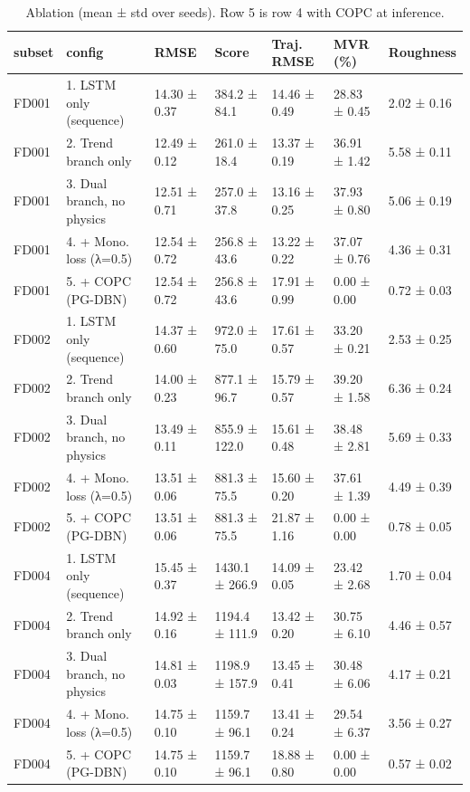 \begin{table}
\caption{Ablation (mean ± std over seeds). Row 5 is row 4 with COPC at inference.}
\label{tab:table2_ablation}
\begin{tabular}{lllllll}
\toprule
subset & config & RMSE & Score & Traj. RMSE & MVR (\%) & Roughness \\
\midrule
FD001 & 1. LSTM only (sequence) & 14.30 ± 0.37 & 384.2 ± 84.1 & 14.46 ± 0.49 & 28.83 ± 0.45 & 2.02 ± 0.16 \\
FD001 & 2. Trend branch only & 12.49 ± 0.12 & 261.0 ± 18.4 & 13.37 ± 0.19 & 36.91 ± 1.42 & 5.58 ± 0.11 \\
FD001 & 3. Dual branch, no physics & 12.51 ± 0.71 & 257.0 ± 37.8 & 13.16 ± 0.25 & 37.93 ± 0.80 & 5.06 ± 0.19 \\
FD001 & 4. + Mono. loss (λ=0.5) & 12.54 ± 0.72 & 256.8 ± 43.6 & 13.22 ± 0.22 & 37.07 ± 0.76 & 4.36 ± 0.31 \\
FD001 & 5. + COPC (PG-DBN) & 12.54 ± 0.72 & 256.8 ± 43.6 & 17.91 ± 0.99 & 0.00 ± 0.00 & 0.72 ± 0.03 \\
FD002 & 1. LSTM only (sequence) & 14.37 ± 0.60 & 972.0 ± 75.0 & 17.61 ± 0.57 & 33.20 ± 0.21 & 2.53 ± 0.25 \\
FD002 & 2. Trend branch only & 14.00 ± 0.23 & 877.1 ± 96.7 & 15.79 ± 0.57 & 39.20 ± 1.58 & 6.36 ± 0.24 \\
FD002 & 3. Dual branch, no physics & 13.49 ± 0.11 & 855.9 ± 122.0 & 15.61 ± 0.48 & 38.48 ± 2.81 & 5.69 ± 0.33 \\
FD002 & 4. + Mono. loss (λ=0.5) & 13.51 ± 0.06 & 881.3 ± 75.5 & 15.60 ± 0.20 & 37.61 ± 1.39 & 4.49 ± 0.39 \\
FD002 & 5. + COPC (PG-DBN) & 13.51 ± 0.06 & 881.3 ± 75.5 & 21.87 ± 1.16 & 0.00 ± 0.00 & 0.78 ± 0.05 \\
FD004 & 1. LSTM only (sequence) & 15.45 ± 0.37 & 1430.1 ± 266.9 & 14.09 ± 0.05 & 23.42 ± 2.68 & 1.70 ± 0.04 \\
FD004 & 2. Trend branch only & 14.92 ± 0.16 & 1194.4 ± 111.9 & 13.42 ± 0.20 & 30.75 ± 6.10 & 4.46 ± 0.57 \\
FD004 & 3. Dual branch, no physics & 14.81 ± 0.03 & 1198.9 ± 157.9 & 13.45 ± 0.41 & 30.48 ± 6.06 & 4.17 ± 0.21 \\
FD004 & 4. + Mono. loss (λ=0.5) & 14.75 ± 0.10 & 1159.7 ± 96.1 & 13.41 ± 0.24 & 29.54 ± 6.37 & 3.56 ± 0.27 \\
FD004 & 5. + COPC (PG-DBN) & 14.75 ± 0.10 & 1159.7 ± 96.1 & 18.88 ± 0.80 & 0.00 ± 0.00 & 0.57 ± 0.02 \\
\bottomrule
\end{tabular}
\end{table}
